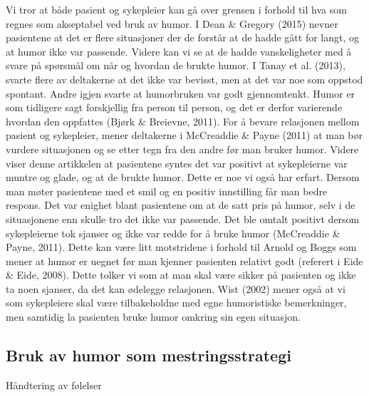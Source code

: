 Vi tror at både pasient og sykepleier kan gå over grensen i forhold til hva som
regnes som akseptabel ved bruk av humor. I Dean \&{} Gregory (2015) nevner
pasientene at det er flere situasjoner der de forstår at de hadde gått for
langt, og at humor ikke var passende. Videre kan vi se at de hadde
vanskeligheter med å svare på spørsmål om når og hvordan de brukte humor. I
Tanay et al. (2013), svarte flere av deltakerne at det ikke var bevisst, men at
det var noe som oppstod spontant. Andre igjen svarte at humorbruken var godt
gjennomtenkt.  Humor er som tidligere sagt forskjellig fra person til person,
og det er derfor varierende hvordan den oppfattes (Bjørk \&{} Breievne, 2011). For
å bevare relasjonen mellom pasient og sykepleier, mener deltakerne i McCreaddie
\&{} Payne (2011) at man bør vurdere situasjonen og se etter tegn fra den andre
før man bruker humor. Videre viser denne artikkelen at pasientene syntes det
var positivt at sykepleierne var muntre og glade, og at de brukte humor. Dette
er noe vi også har erfart. Dersom man møter pasientene med et smil og en
positiv innstilling får man bedre respons. Det var enighet blant pasientene om
at de satt pris på humor, selv i de situasjonene enn skulle tro det ikke var
passende. Det ble omtalt positivt dersom sykepleierne tok sjanser og ikke var
redde for å bruke humor (McCreaddie \&{} Payne, 2011). Dette kan være litt
motstridene i forhold til Arnold og Boggs som mener at humor er uegnet før man
kjenner pasienten relativt godt (referert i Eide \&{} Eide, 2008). Dette tolker vi
som at man skal være sikker på pasienten og ikke ta noen sjanser, da det kan
ødelegge relasjonen. Wist (2002) mener også at vi som sykepleiere skal være
tilbakeholdne med egne humoristiske bemerkninger, men samtidig la pasienten
bruke humor omkring sin egen situasjon.

\subsection{Bruk av humor som mestringsstrategi}

Håndtering av følelser

